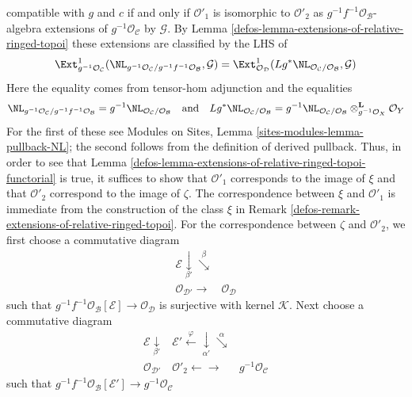 \begin{remark}
compatible with $g$ and $c$ if and only if $\mathcal{O}'_1$ is isomorphic
to $\mathcal{O}'_2$ as $g^{-1}f^{-1}\mathcal{O}_\mathcal{B}$-algebra extensions
of $g^{-1}\mathcal{O}_\mathcal{C}$ by $\mathcal{G}$. By
Lemma \ref{defos-lemma-extensions-of-relative-ringed-topoi}
these extensions are classified by the LHS of
$$
\Ext^1_{g^{-1}\mathcal{O}_\mathcal{C}}(
\NL_{g^{-1}\mathcal{O}_\mathcal{C}/g^{-1}f^{-1}\mathcal{O}_\mathcal{B}},
\mathcal{G}) =
\Ext^1_{\mathcal{O}_\mathcal{D}}(
Lg^*\NL_{\mathcal{O}_\mathcal{C}/\mathcal{O}_\mathcal{B}}, \mathcal{G})
$$
Here the equality comes from tensor-hom adjunction and
the equalities
$$
\NL_{g^{-1}\mathcal{O}_\mathcal{C}/g^{-1}f^{-1}\mathcal{O}_\mathcal{B}} =
g^{-1}\NL_{\mathcal{O}_\mathcal{C}/\mathcal{O}_\mathcal{B}}
\quad\text{and}\quad
Lg^*\NL_{\mathcal{O}_\mathcal{C}/\mathcal{O}_\mathcal{B}} =
g^{-1}\NL_{\mathcal{O}_\mathcal{C}/\mathcal{O}_\mathcal{B}}
\otimes_{g^{-1}\mathcal{O}_X}^\mathbf{L} \mathcal{O}_Y
$$
For the first of these see
Modules on Sites, Lemma \ref{sites-modules-lemma-pullback-NL}; the second
follows from the definition of derived pullback.
Thus, in order to see that
Lemma \ref{defos-lemma-extensions-of-relative-ringed-topoi-functorial}
is true, it suffices to show that $\mathcal{O}'_1$ corresponds
to the image of $\xi$ and that $\mathcal{O}'_2$ correspond to
the image of $\zeta$.
The correspondence between $\xi$ and $\mathcal{O}'_1$
is immediate from the construction of the class $\xi$ in
Remark \ref{defos-remark-extensions-of-relative-ringed-topoi}.
For the correspondence between $\zeta$ and $\mathcal{O}'_2$,
we first choose a commutative diagram
$$
\begin{array}{cc}\mathcal{E} \underset{\beta'}{\downarrow}\overset{\beta}{\searrow} &  \\ \mathcal{O}_{\mathcal{D}'} \longrightarrow & \mathcal{O}_\mathcal{D}\end{array}
$$
such that $g^{-1}f^{-1}\mathcal{O}_\mathcal{B}[\mathcal{E}] \to
\mathcal{O}_\mathcal{D}$
is surjective with kernel $\mathcal{K}$. Next choose a
commutative diagram
$$
\begin{array}{ccc}\mathcal{E} \underset{\beta'}{\downarrow} & \mathcal{E}' \overset{\varphi}{\longleftarrow}\underset{\alpha'}{\downarrow}\overset{\alpha}{\searrow} &  \\ \mathcal{O}_{\mathcal{D}'} & \mathcal{O}'_2 \longleftarrow\longrightarrow & g^{-1}\mathcal{O}_\mathcal{C}\end{array}
$$
such that $g^{-1}f^{-1}\mathcal{O}_\mathcal{B}[\mathcal{E}'] \to
g^{-1}\mathcal{O}_\mathcal{C}$

\end{remark}

